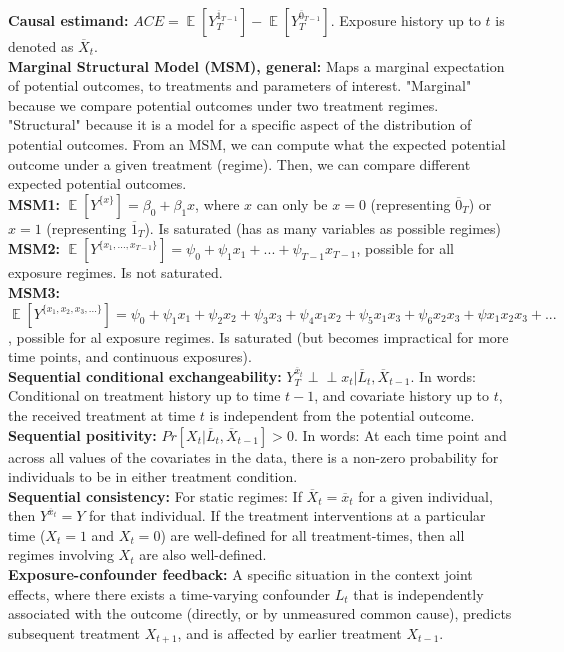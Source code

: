 \documentclass[a4paper,7pt,landscape]{extarticle}
\newcommand{\indep}{\perp \!\!\! \perp} %
\DeclareMathOperator*{\E}{\mathbb{E}} %
\begin{document}
\begin{multicols}{3}
\begin{boxA}
\textbf{Causal estimand:} $ACE = \E [Y_T^{\overline{1}_{T-1}}] - \E [Y_T^{\overline{0}_{T-1}}]$. Exposure history up to $t$ is denoted as $\overline{X}_t$.\\
\textbf{Marginal Structural Model (MSM), general:} Maps a marginal expectation of potential outcomes, to treatments and parameters of interest. "Marginal" because we compare potential outcomes under two treatment regimes. "Structural" because it is a model for a specific aspect of the distribution of potential outcomes. From an MSM, we can compute what the expected potential outcome under a given treatment (regime). Then, we can compare different expected potential outcomes.\\
\textbf{MSM1:} $\E [Y^{\{x\}}] = \beta_0 + \beta_1 x$, where $x$ can only be $x = 0$ (representing $\overline{0}_T$) or $x = 1$ (representing $\overline{1}_T$). Is saturated (has as many variables as possible regimes)\\
\textbf{MSM2:} $\E [Y^{\{x_1,...,x_{T-1}\}}] = \psi_0 + \psi_1 x_1 + ... + \psi_{T-1} x_{T-1}$, possible for all exposure regimes. Is not saturated.\\
\textbf{MSM3:} $\E [Y^{\{x_1,x_2,x_3,...\}}] = \psi_0 + \psi_1 x_1 + \psi_2 x_2 + \psi_3 x_3 + \psi_4 x_1 x_2 + \psi_5 x_1 x_3 + \psi_6 x_2 x_3 + \psi x_1 x_2 x_3 + ...$, possible for al exposure regimes. Is saturated (but becomes impractical for more time points, and continuous exposures).\\
\textbf{Sequential conditional exchangeability:} $Y_T^{\overline{x}_t} \indep x_t | \overline{L}_{t}, \overline{X}_{t-1}$. In words: Conditional on treatment history up to time $t - 1$, and covariate history up to $t$, the received treatment at time $t$ is independent from the potential outcome.\\
\textbf{Sequential positivity:} $Pr[X_t | \overline{L}_t, \overline{X}_{t-1}] > 0$. In words: At each time point and across all values of the covariates in the data, there is a non-zero probability for individuals to be in either treatment condition.\\
\textbf{Sequential consistency:} For static regimes: If $\overline{X}_t = \overline{x}_t$ for a given individual, then $Y^{\overline{x}_t} = Y$ for that individual. If the treatment interventions at a particular time ($X_t = 1$ and $X_t = 0$) are well-defined for all treatment-times, then all regimes involving $X_t$ are also well-defined.\\
\textbf{Exposure-confounder feedback:} A specific situation in the context joint effects, where there exists a time-varying confounder $L_t$ that is independently associated with the outcome (directly, or by unmeasured common cause), predicts subsequent treatment $X_{t+1}$, and is affected by earlier treatment $X_{t-1}$.\\

\end{boxA}
\end{multicols}
\end{document}
